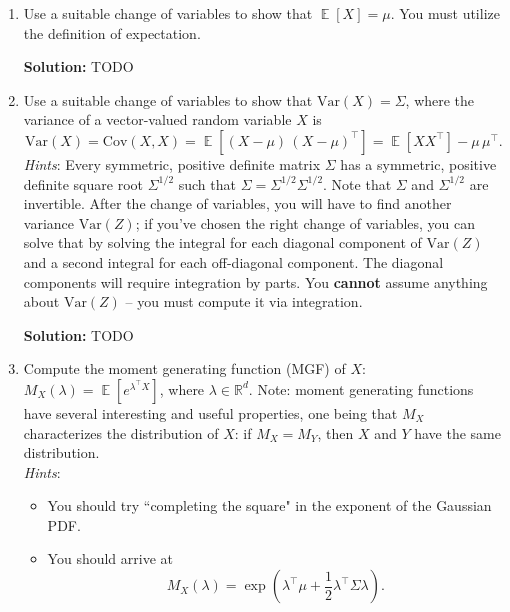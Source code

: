 \documentclass{article}
\DeclareMathOperator{\E}{\mathbb{E}}
\newenvironment{solution}{\color{blue} \smallskip \textbf{Solution:}}{}
\begin{document}
\begin{enumerate}

    \item
    Use a suitable change of variables to show that $\E[X] = \mu$. 
    You must utilize the definition of expectation.

    \begin{solution}
        TODO
    \end{solution}

    \item
    Use a suitable change of variables to show that $\mathrm{Var}(X) = \Sigma$, where the variance of a vector-valued random variable $X$ is
    \[
        \mathrm{Var}(X) = \mathrm{Cov}(X, X) = \E[(X - \mu) \, (X - \mu)^\top] = \E[XX^\top] - \mu \, \mu^\top.
    \]
    \emph{Hints}: Every symmetric, positive  definite matrix $\Sigma$ has a symmetric, positive definite square root $\Sigma^{1/2}$ such that $\Sigma = \Sigma^{1/2} \Sigma^{1/2}$.
    Note that $\Sigma$ and $\Sigma^{1/2}$ are invertible.
    After the change of variables, you will have to find another variance $\mathrm{Var}(Z)$; if you've chosen the right change of variables, you can solve that by solving the integral for each diagonal component of $\mathrm{Var}(Z)$ and a second integral for each off-diagonal component.
    The diagonal components will require integration by parts.
    You \textbf{cannot} assume anything about $\mathrm{Var}(Z)$ -- you must compute it via integration.

    \begin{solution}
        TODO
    \end{solution}

    \item
    Compute the moment generating function (MGF) of $X$: $M_X(\lambda) = \E[e^{\lambda^\top X}]$, where $\lambda \in \mathbb R^d$. 
    Note: moment generating functions have several interesting and useful properties, one being that $M_X$ characterizes the distribution of $X$: if $M_X = M_Y$, then $X$ and $Y$ have the same distribution.\\
    \emph{Hints}:
    \begin{itemize}
        \item You should try ``completing the square" in the exponent of the Gaussian PDF.
        \item You should arrive at 
        \[
            M_X(\lambda) = \exp\left(\lambda^\top\mu + \frac12 \lambda^\top\Sigma\lambda\right).
        \]
    \end{itemize}


\end{enumerate}
\end{document}
